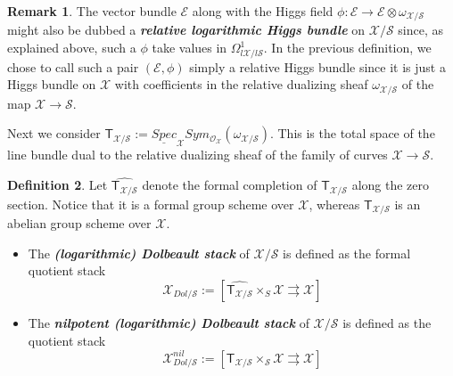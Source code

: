 \documentclass[11pt]{amsart}
\theoremstyle{plain}
\numberwithin{equation}{section}
\theoremstyle{definition}
\newtheorem{Def}{Definition}[section]
\newtheorem{Rem}[Def]{Remark}
\theoremstyle{plain}
\begin{document}
\smallskip

\begin{Rem} The vector bundle $\mathcal E$ along with the Higgs field $\phi : \mathcal{E} \to \mathcal{E}\otimes \omega_{\mathcal{X}/\mathcal{S}}$ might also be dubbed a \emph{\bfseries relative logarithmic Higgs bundle} on $\mathcal{X}/\mathcal{S}$ since, as explained above,  such a $\phi$ take values in $\Omega^{1}_{l\mathcal{X}/l\mathcal{S}}$.  In the previous definition, we chose to call such a pair $(\mathcal{E},\phi)$  simply a relative Higgs bundle since it is just a Higgs bundle on $\mathcal{X}$ with coefficients in the relative dualizing sheaf $\omega_{\mathcal{X}/\mathcal{S}}$ of the map $\mathcal{X} \to \mathcal{S}$.
\end{Rem}

\smallskip


\noindent
Next we consider $\mathsf{T}_{\mathcal X/\mathcal S}:=\underline{Spec}_{\mathcal X} Sym_{\mathcal O_{\mathcal X}} (\omega_{\mathcal X/\mathcal S})$. This is the total space of the line bundle dual to the relative dualizing sheaf of the family of curves $\mathcal X\longrightarrow \mathcal S$.


\smallskip


\begin{Def}
Let $\widehat{\mathsf{T}_{\mathcal X/\mathcal S}}$ denote the formal completion of $\mathsf{T}_{\mathcal X/\mathcal S}$ along the zero section. Notice that it is a formal group scheme over $\mathcal X$, whereas $\mathsf{T}_{\mathcal X/\mathcal S}$ is an abelian group scheme over $\mathcal X$. 
\begin{itemize} 
\item The \emph{\bfseries (logarithmic) Dolbeault stack} of $\mathcal X/\mathcal S$ is defined as the formal quotient stack
\begin{equation}
\mathcal X_{Dol/\mathcal S}:= \left[\widehat{\mathsf{T}_{\mathcal X/\mathcal S}}\times_S \mathcal X \rightrightarrows \mathcal X\right]
\end{equation}
\item 
The \emph{\bfseries nilpotent (logarithmic) Dolbeault stack} of $\mathcal X/\mathcal S$ is defined as the quotient stack 
\begin{equation}
\mathcal X^{nil}_{Dol/\mathcal S}:=[\mathsf{T}_{\mathcal X/\mathcal S}\times_{\mathcal S} \mathcal X\rightrightarrows \mathcal X]
\end{equation}
\end{itemize}
\end{Def}
\end{document}
